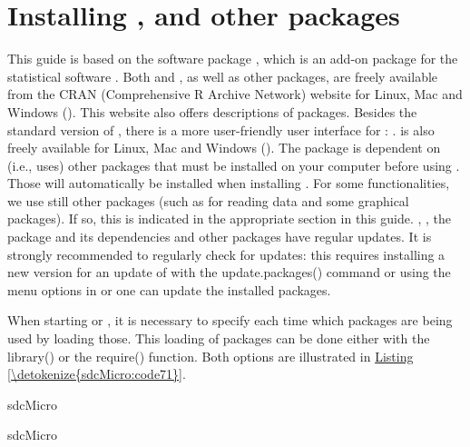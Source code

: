\documentclass[letterpaper,10pt,english]{sphinxmanual}
\begin{document}
\section{Installing ,  and other packages}
\label{\detokenize{sdcMicro:installing-r-sdcmicro-and-other-packages}}
This guide is based on the software package , which is an
add-on package for the statistical software . Both  and
, as well as other  packages, are freely available from the
CRAN (Comprehensive R Archive Network) website for Linux, Mac and
Windows (). This website also offers
descriptions of packages. Besides the standard version of , there is
a more user-friendly user interface for : .  is
also freely available for Linux, Mac and Windows
(). The  package is dependent on (i.e.,
uses) other  packages that must be installed on your computer before
using . Those will automatically be installed when installing
. For some functionalities, we use still other packages (such
as  for reading data and some graphical packages). If so, this
is indicated in the appropriate section in this guide. , ,
the  package and its dependencies and other packages have
regular updates. It is strongly recommended to regularly check for
updates: this requires installing a new version for an update of 
with the update.packages() command or using the menu options in  or
 one can update the installed packages.

When starting  or , it is necessary to specify each time
which packages are being used by loading those. This loading of packages
can be done either with the library() or the require() function. Both
options are illustrated in \hyperref[\detokenize{sdcMicro:code71}]{Listing \ref{\detokenize{sdcMicro:code71}}}.

\def\sphinxLiteralBlockLabel{\label{\detokenize{sdcMicro:code71}}}
%
\begin{sphinxVerbatim}[commandchars=\\\{\},numbers=left,firstnumber=1,stepnumber=1]
     sdcMicro 

     sdcMicro 
\end{sphinxVerbatim}
\end{document}
